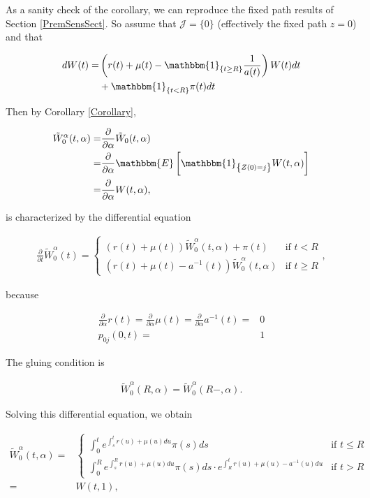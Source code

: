 \documentclass{article}
\newcommand{\1}[1]{\mathbbm{1}_{\left\lbrace #1 \right\rbrace}}
\newcommand{\expec}[1][def]{\mathbbm{E} \left[ #1 \right]}
\theoremstyle{break}
\theoremstyle{remark}
\numberwithin{equation}{section}
\begin{document}
\begin{example} \label{Replicate}
	As a sanity check of the corollary, we can reproduce the fixed path results of Section \ref{PremSensSect}. So assume that $\mathcal{J} = \{ 0 \}$ (effectively the fixed path $z=0$) and that
	
	\begin{align*}
		dW(t) =& \left( r(t) + \mu(t) - \1{t \geq R} \frac{1}{a(t)}\right) W(t)dt \\
		&+ \1{t<R} \pi(t)dt
	\end{align*}

	Then by Corollary \ref{Corollary},
	
	\begin{align*}
		\tilde{W}_0^\alpha(t,\alpha) =& \frac{\partial}{\partial \alpha} \tilde{W}_0(t,\alpha) \\
		=& \frac{\partial}{\partial \alpha} \expec[\1{Z(0)=j} W(t,\alpha)] \\
		=& \frac{\partial}{\partial \alpha} W(t,\alpha),
	\end{align*}

	is characterized by the differential equation
	
	\begin{align*}
		\frac{\partial}{\partial t} \tilde{W}_0^\alpha(t) = \left\{
		\begin{array}{ll}
			\left(r(t) + \mu(t) \right) \tilde{W}_0^\alpha(t,\alpha) + \pi(t) & \mbox{if } t < R \\
			\left( r(t) + \mu(t) - a^{-1}(t) \right) \tilde{W}_0^\alpha(t,\alpha) & \mbox{if } t \geq R
		\end{array}
		\right.,
	\end{align*}

	because
	
	\begin{align*}
		\frac{\partial}{\partial \alpha} r(t) = \frac{\partial}{\partial \alpha} \mu(t) = \frac{\partial}{\partial \alpha} a^{-1}(t) =& 0 \\
		p_{0j}(0,t)=&1
	\end{align*}
	
	The gluing condition is
	
	\begin{align*}
		\tilde{W}_0^\alpha(R,\alpha) = \tilde{W}_0^\alpha(R-,\alpha).
	\end{align*}
	
	Solving this differential equation, we obtain
	
	\begin{align*}
	\tilde{W}_0^\alpha(t,\alpha) =& \left\{
		\begin{array}{ll}
			\int_0^t e^{\int_s^t r(u) + \mu(u) du} \pi(s) ds & \mbox{if } t \leq R \\
			\int_0^R e^{\int_s^R r(u) + \mu(u) du} \pi(s) ds \cdot e^{\int_R^t r(u) + \mu(u) - a^{-1}(u) du} & \mbox{if } t > R
		\end{array}
		\right. \\
		=& W(t,1),
	\end{align*}


\end{example}
\end{document}
